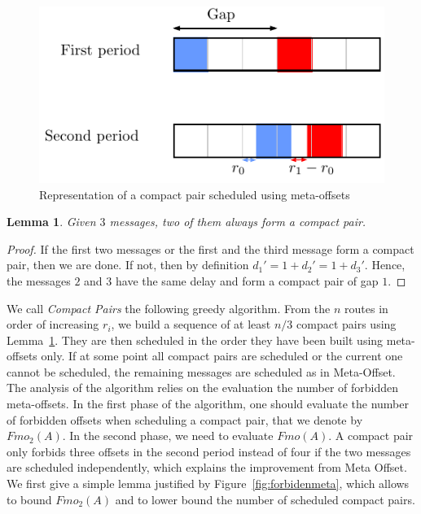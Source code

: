 \documentclass[10pt, conference, letterpaper]{IEEEtran}
\newtheorem{lemma}[theorem]{Lemma}
\begin{document}
\begin{figure}[h]
\begin{center}

\includegraphics[scale=0.7]{compact_pair}
\end{center}
\caption{Representation of a compact pair scheduled using meta-offsets}
\end{figure}

\begin{lemma}\label{lemma:pair_find}
Given $3$ messages, two of them always form a compact pair. 
\end{lemma}
\begin{proof}
If the first two messages or the first and the third message form a compact pair,
then we are done. If not, then by definition $d_{1}' = 1 + d_{2}' = 1 + d_{3}'$. Hence, the messages $2$ and $3$ have the same delay and form a compact pair of gap $1$.
\end{proof}

We call \emph{Compact Pairs} the following greedy algorithm. From the $n$ routes in order
of increasing $r_i$, we build a sequence of at least $n/3$ compact pairs using Lemma~\ref{lemma:pair_find}. They are then scheduled in the order they have been built using meta-offsets only. If at some point all compact pairs are scheduled or the current one cannot be scheduled, the remaining messages are scheduled as in Meta-Offset. The analysis of the algorithm relies on the evaluation the number of forbidden meta-offsets. In the first phase of the algorithm, one should evaluate the number of forbidden offsets when scheduling a compact pair, that we denote by $Fmo_2(A)$. In the second phase, we need to evaluate 
$Fmo(A)$. A compact pair only forbids three offsets in the second period instead of four if the two messages are scheduled independently, which explains the improvement from Meta Offset. We first give a simple lemma justified by Figure~\ref{fig:forbidenmeta}, which allows to bound $Fmo_2(A)$ and to lower bound the number of scheduled compact pairs.
\end{document}
